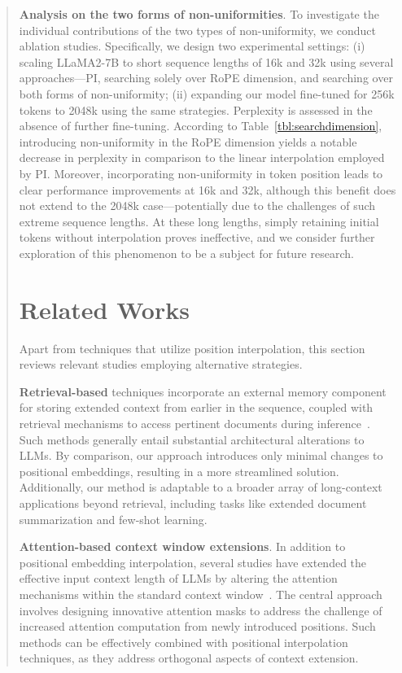 \begin{abstract}
\textbf{Analysis on the two forms of non-uniformities}. To investigate the individual contributions of the two types of non-uniformity, we conduct ablation studies. Specifically, we design two experimental settings: (i) scaling LLaMA2-7B to short sequence lengths of 16k and 32k using several approaches—PI, searching solely over RoPE dimension, and searching over both forms of non-uniformity; (ii) expanding our model fine-tuned for 256k tokens to 2048k using the same strategies. Perplexity is assessed in the absence of further fine-tuning. According to Table~\ref{tbl:searchdimension}, introducing non-uniformity in the RoPE dimension yields a notable decrease in perplexity in comparison to the linear interpolation employed by PI. Moreover, incorporating non-uniformity in token position leads to clear performance improvements at 16k and 32k, although this benefit does not extend to the 2048k case—potentially due to the challenges of such extreme sequence lengths. At these long lengths, simply retaining initial tokens without interpolation proves ineffective, and we consider further exploration of this phenomenon to be a subject for future research.

\section{Related Works}

Apart from techniques that utilize position interpolation, this section reviews relevant studies employing alternative strategies.

\textbf{Retrieval-based} techniques incorporate an external memory component for storing extended context from earlier in the sequence, coupled with retrieval mechanisms to access pertinent documents during inference~\cite{longllama,wang2023augmenting,borgeaud2022improving}. Such methods generally entail substantial architectural alterations to LLMs. By comparison, our approach introduces only minimal changes to positional embeddings, resulting in a more streamlined solution. Additionally, our method is adaptable to a broader array of long-context applications beyond retrieval, including tasks like extended document summarization and few-shot learning.

\textbf{Attention-based context window extensions}. In addition to positional embedding interpolation, several studies have extended the effective input context length of LLMs by altering the attention mechanisms within the standard context window~\cite{han2023lminfinite, streamingllm,parallelwindow}. The central approach involves designing innovative attention masks to address the challenge of increased attention computation from newly introduced positions. Such methods can be effectively combined with positional interpolation techniques, as they address orthogonal aspects of context extension.


\end{abstract}
